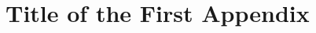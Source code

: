 \documentclass[thesis.tex]{subfiles}
\begin{document}
\chapter{Title of the First Appendix}
\label{chapter:appendix-a}
\end{document}
